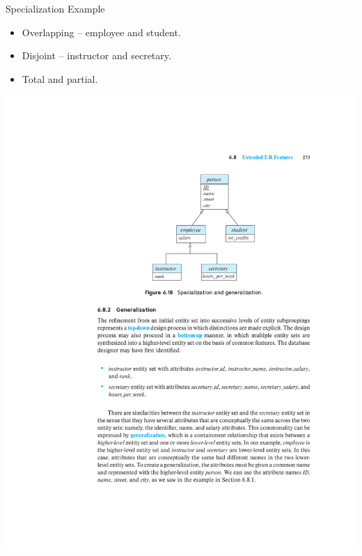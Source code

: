 \documentclass{beamer}
\begin{document}
\begin{frame}{Specialization Example}
    \begin{itemize}
        \item Overlapping – employee and student.
        \item Disjoint – instructor and secretary.
        \item Total and partial.
    \end{itemize}
    \centering
    \includegraphics[trim={6cm 16cm 4cm 4.8cm}, clip, width=\textwidth]{figures/specialization}
\end{frame}
\end{document}
